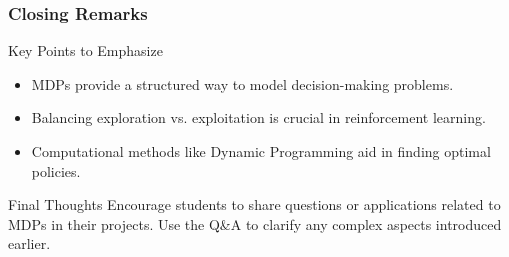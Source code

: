 \documentclass[aspectratio=169]{beamer}
\begin{document}
\begin{frame}[fragile]
    \frametitle{Closing Remarks}
    
    \begin{block}{Key Points to Emphasize}
        \begin{itemize}
            \item MDPs provide a structured way to model decision-making problems.
            \item Balancing exploration vs. exploitation is crucial in reinforcement learning.
            \item Computational methods like Dynamic Programming aid in finding optimal policies.
        \end{itemize}
    \end{block}
    
    \begin{block}{Final Thoughts}
        Encourage students to share questions or applications related to MDPs in their projects. Use the Q&A to clarify any complex aspects introduced earlier.
    \end{block}
\end{frame}
\end{document}

